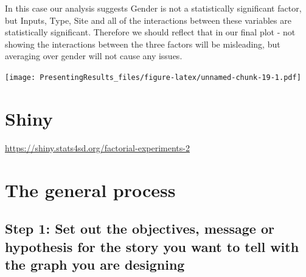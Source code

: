 \documentclass[
]{book}
\begin{document}
In this case our analysis suggests Gender is not a statistically significant factor, but Inputs, Type, Site and all of the interactions between these variables are statistically significant. Therefore we should reflect that in our final plot - not showing the interactions between the three factors will be misleading, but averaging over gender will not cause any issues.

\texttt{[image: PresentingResults\_files/figure-latex/unnamed-chunk-19-1.pdf]}

\hypertarget{shiny}{%
\section{Shiny}\label{shiny}}

\label{fig:unnamed-chunk-20}\url{https://shiny.stats4sd.org/factorial-experiments-2}

\hypertarget{the-general-process}{%
\section{The general process}\label{the-general-process}}

\hypertarget{step-1-set-out-the-objectives-message-or-hypothesis-for-the-story-you-want-to-tell-with-the-graph-you-are-designing}{%
\subsection{Step 1: Set out the objectives, message or hypothesis for the story you want to tell with the graph you are designing}\label{step-1-set-out-the-objectives-message-or-hypothesis-for-the-story-you-want-to-tell-with-the-graph-you-are-designing}}
\end{document}
